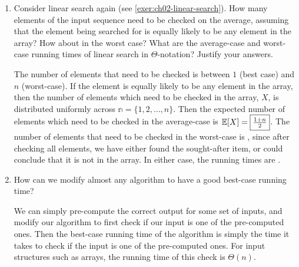 \documentclass[Chapter02]{subfiles}
\begin{document}
\begin{enumerate}
		\item Consider linear search again (see \cref{exer:ch02-linear-search}). How many elements of the input sequence need to be checked on the average, assuming that the element being searched for is equally likely to be any element in the array? How about in the worst case? What are the average-case and worst-case running times of linear search in $\Theta$-notation? Justify your answers.
		\begin{answer}
			The number of elements that need to be checked is between $1$ (best case) and $n$ (worst-case). If the element is equally likely to be any element in the array, then the number of elements which need to be checked in the array, $X$, is distributed uniformly across $\mathbb{n} = \{1, 2, \dots, n\}$. Then the expected number of elements which need to be checked in the average-case is $\mathbb{E}[X] = \fbox{$\frac{1 + n}{2}$}$. The number of elements that need to be checked in the worst-case is , since after checking all elements, we have either found the sought-after item, or could conclude that it is not in the array. In either case, the running times are .
		\end{answer}

		\item How can we modify almost any algorithm to have a good best-case running time?
		\begin{answer}
			We can simply pre-compute the correct output for some set of inputs, and modify our algorithm to first check if our input is one of the pre-computed ones. Then the best-case running time of the algorithm is simply the time it takes to check if the input is one of the pre-computed ones. For input structures such as arrays, the running time of this check is $\Theta(n)$.
		\end{answer}

	\end{enumerate}
\end{document}
